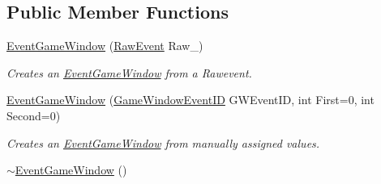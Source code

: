\subsection*{Public Member Functions}
\begin{DoxyCompactItemize}
\item 
\hyperlink{classphys_1_1EventGameWindow_aca917d4cf8ee17dd5253c294aac75bb8}{EventGameWindow} (\hyperlink{namespacephys_a8126d26e4507e66d09876988bb941fd4}{RawEvent} Raw\_\-)
\begin{DoxyCompactList}\small\item\em Creates an \hyperlink{classphys_1_1EventGameWindow}{EventGameWindow} from a Rawevent. \item\end{DoxyCompactList}\item 
\hyperlink{classphys_1_1EventGameWindow_a7ee9c85879de43a995e6ce966b8a940c}{EventGameWindow} (\hyperlink{classphys_1_1EventGameWindow_a45225255070513d3cff88cdfea25cc09}{GameWindowEventID} GWEventID, int First=0, int Second=0)
\begin{DoxyCompactList}\small\item\em Creates an \hyperlink{classphys_1_1EventGameWindow}{EventGameWindow} from manually assigned values. \item\end{DoxyCompactList}\item 
\hypertarget{classphys_1_1EventGameWindow_aa6e0b4f13327caaaab3e4656e6a9fa13}{
\hyperlink{classphys_1_1EventGameWindow_aa6e0b4f13327caaaab3e4656e6a9fa13}{$\sim$EventGameWindow} ()}
\label{d4/d0f/classphys_1_1EventGameWindow_aa6e0b4f13327caaaab3e4656e6a9fa13}


\end{DoxyCompactItemize}
